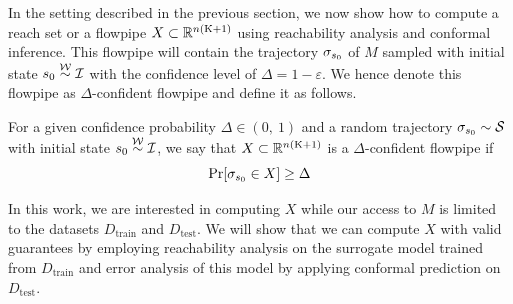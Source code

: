 
In the setting described in the previous section, we now show how to compute a reach set or a flowpipe $X\subset \mathbb{R}^{n(\mathrm{K}+1)}$ using reachability analysis and conformal inference. This flowpipe will contain the trajectory $\sigma_{s_0}$ of $M$ sampled with initial state $s_0 \stackrel{\mathcal{W}}{\sim} \mathcal{I}$ with the confidence level of $\Delta = 1-\varepsilon$. We hence denote this flowpipe as $\Delta$-confident flowpipe and  define it as follows. 

\begin{definition} For a given confidence probability $\Delta\in (0,\ 1)$ and  a random trajectory $\sigma_{s_0} \sim \mathcal{S}$ with initial state $s_{0} \stackrel{\mathcal{W}}{\sim} \mathcal{I}$, we say that $X \subset \mathbb{R}^{n(\mathrm{K}+1)}$ is a $\Delta$-confident flowpipe if
\begin{equation}\label{eq:confreg}
\Pr[\sigma_{s_0} \in X ] \geq \Delta
\end{equation}
    
\end{definition}
In this work, we are interested in computing $X$ while our access to $M$ is limited to the datasets $D_{\text{train}}$ and $D_{\text{test}}$. We will show that we can compute $X$ with valid guarantees by employing reachability analysis on the surrogate model trained from $D_{\text{train}}$ and error analysis of this model by applying conformal prediction on $D_{\text{test}}$. 

